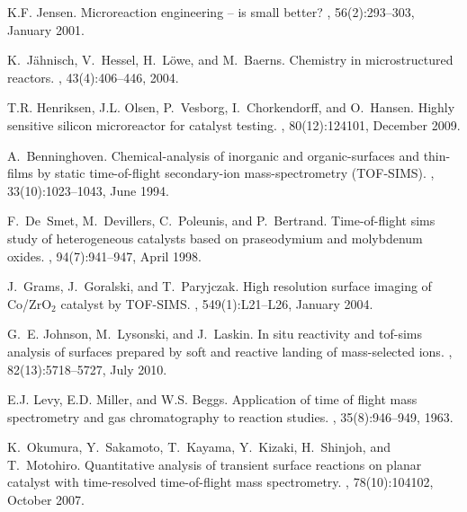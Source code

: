 \documentclass[aip,rsi]{revtex4-1}
\begin{document}
\begin{thebibliography}{10}

K.F. Jensen.
\newblock Microreaction engineering -- is small better?
, 56(2):293--303, January 2001.

K.~J\"{a}hnisch, V.~Hessel, H.~L\"{o}we, and M.~Baerns.
\newblock Chemistry in microstructured reactors.
, 43(4):406--446, 2004.

T.R. Henriksen, J.L. Olsen, P.~Vesborg, I.~Chorkendorff, and O.~Hansen.
\newblock Highly sensitive silicon microreactor for catalyst testing.
, 80(12):124101, December 2009.

A.~Benninghoven.
\newblock Chemical-analysis of inorganic and organic-surfaces and thin-films by
  static time-of-flight secondary-ion mass-spectrometry ({TOF}-{SIMS}).
,
  33(10):1023--1043, June 1994.

F.~De~Smet, M.~Devillers, C.~Poleunis, and P.~Bertrand.
\newblock Time-of-flight sims study of heterogeneous catalysts based on
  praseodymium and molybdenum oxides.
,
  94(7):941--947, April 1998.

J.~Grams, J.~Goralski, and T.~Paryjczak.
\newblock High resolution surface imaging of {C}o/{Z}r{O}$_2$ catalyst by
  {TOF}-{SIMS}.
, 549(1):L21--L26, January 2004.

G.~E. Johnson, M.~Lysonski, and J.~Laskin.
\newblock In situ reactivity and tof-sims analysis of surfaces prepared by soft
  and reactive landing of mass-selected ions.
, 82(13):5718--5727, July 2010.

E.J. Levy, E.D. Miller, and W.S. Beggs.
\newblock Application of time of flight mass spectrometry and gas
  chromatography to reaction studies.
, 35(8):946--949, 1963.

K.~Okumura, Y.~Sakamoto, T.~Kayama, Y.~Kizaki, H.~Shinjoh, and T.~Motohiro.
\newblock Quantitative analysis of transient surface reactions on planar
  catalyst with time-resolved time-of-flight mass spectrometry.
, 78(10):104102, October 2007.


\end{thebibliography}
\end{document}
